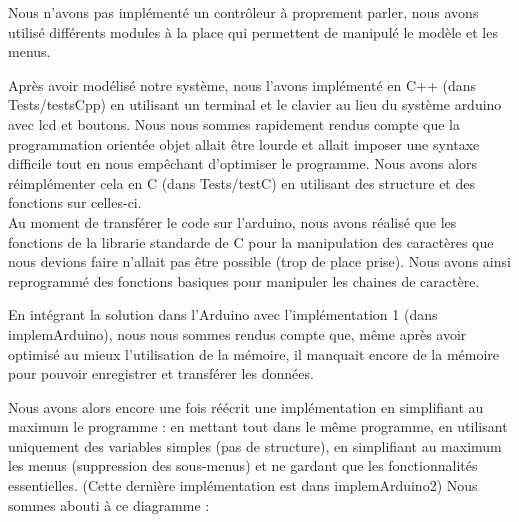 \documentclass{report}
\begin{document}
Nous n'avons pas implémenté un contrôleur à proprement parler, nous avons
utilisé différents modules à la place qui permettent de manipulé le
modèle et les menus.

Après avoir modélisé notre système, nous l'avons implémenté en C++ (dans Tests/testsCpp) en
utilisant un terminal et le clavier au lieu du système arduino avec lcd
et boutons. Nous nous sommes rapidement rendus compte que la 
programmation orientée objet allait
être lourde et allait imposer une syntaxe difficile tout en nous empêchant
d'optimiser le programme. Nous avons alors réimplémenter cela en C (dans Tests/testC) en
utilisant des structure et des fonctions sur celles-ci. \\
Au moment de transférer le code sur l'arduino, nous avons réalisé que
les fonctions de la librarie standarde de C pour la manipulation des
caractères que nous devions faire n'allait pas être possible (trop de place
prise). Nous avons ainsi reprogrammé des fonctions basiques pour manipuler
les chaines de caractère.

En intégrant la solution dans l'Arduino avec l'implémentation 1
(dans implemArduino), nous nous sommes rendus compte
que, même après avoir optimisé au mieux l'utilisation de la mémoire, il
manquait encore de la mémoire pour pouvoir enregistrer et transférer les
données.

Nous avons alors encore une fois réécrit une implémentation en simplifiant
au maximum le programme : en mettant tout dans le même programme, en
 utilisant uniquement des variables simples (pas de structure), en
 simplifiant au maximum les menus (suppression des sous-menus)
 et ne gardant que les fonctionnalités essentielles.
 (Cette dernière implémentation est dans implemArduino2)
 Nous sommes abouti à ce diagramme :
 
\end{document}
